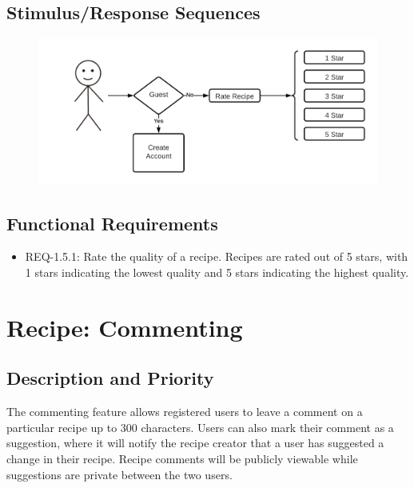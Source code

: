 \documentclass{scrreprt}
\begin{document}
\subsection{Stimulus/Response Sequences}

\begin{figure}[H]\centering
    \includegraphics[width=\columnwidth]{FlowCharts/Recipe-Rating.png}
\end{figure}

\subsection{Functional Requirements}

\begin{itemize}
    \item REQ-1.5.1: Rate the quality of a recipe. Recipes are rated out of 5 stars, with 1 stars indicating the lowest quality and 5 stars indicating the highest quality.
\end{itemize}

\section{Recipe: Commenting}

\subsection{Description and Priority}

The commenting feature allows registered users to leave a comment on a particular recipe up to 300 characters. Users can also mark their comment as a suggestion, where it will notify the recipe creator that a user has suggested a change in their recipe. Recipe comments will be publicly viewable while suggestions are private between the two users.
\end{document}
